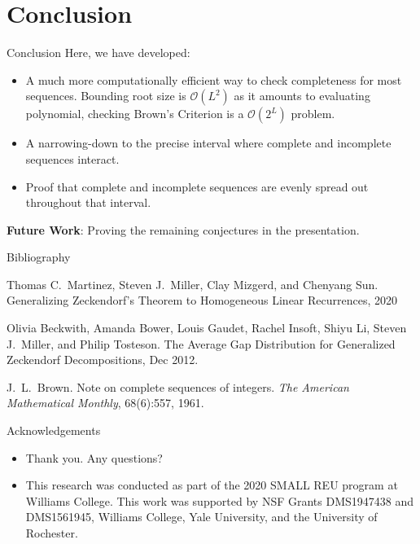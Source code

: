 \documentclass{beamer}
\begin{document}
\section{Conclusion}
\begin{frame}{Conclusion}
Here, we have developed:
\begin{itemize}
\item
	A much more computationally efficient way to check completeness for most sequences. Bounding root size is $\mathcal{O}\left( L^2 \right) $ as it amounts to evaluating polynomial, checking Brown's Criterion is a $\mathcal{O}\left( 2^{L} \right) $ problem.
\pause
\item
A narrowing-down to the precise interval where complete and incomplete sequences interact.
\pause
\item Proof that complete and incomplete sequences are evenly spread out throughout that interval.
\end{itemize}
\pause 
\textbf{Future Work}: Proving the remaining conjectures in the presentation.
\end{frame}

\begin{frame}{Bibliography}
\begin{thebibliography}{BBGILMT}


     Thomas C.\ Martinez, Steven J.\ Miller, Clay Mizgerd, and Chenyang Sun. Generalizing Zeckendorf's Theorem to Homogeneous Linear Recurrences, 2020
	
	 Olivia Beckwith, Amanda Bower, Louis Gaudet, Rachel Insoft, Shiyu Li, Steven J.\ Miller, and Philip Tosteson. The Average Gap Distribution for Generalized Zeckendorf Decompositions, Dec 2012.
	
	 J.\ L.\ Brown. Note on complete sequences of integers. \emph{The  American  Mathematical  Monthly}, 68(6):557, 1961.
	
\end{thebibliography}
\end{frame}

\begin{frame}{Acknowledgements}
    \begin{itemize}
        \item Thank you. Any questions?
    
        \item This research was conducted as part of the 2020 SMALL REU program at Williams College. This work was supported by NSF Grants DMS1947438 and DMS1561945, Williams College, Yale University, and the University of Rochester.
    \end{itemize}
\end{frame}
\end{document}
